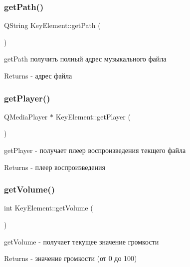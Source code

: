 \subsubsection{\texorpdfstring{get\+Path()}{getPath()}}
{\footnotesize\ttfamily Q\+String Key\+Element\+::get\+Path (\begin{DoxyParamCaption}{ }\end{DoxyParamCaption})}



get\+Path получить полный адрес музыкального файла 

\begin{DoxyReturn}{Returns}
-\/ адрес файла 
\end{DoxyReturn}
\mbox{\label{class_key_element_ae961bfbc0ce3eeb9b62ad12100ca977f}} 
\subsubsection{\texorpdfstring{get\+Player()}{getPlayer()}}
{\footnotesize\ttfamily Q\+Media\+Player $\ast$ Key\+Element\+::get\+Player (\begin{DoxyParamCaption}{ }\end{DoxyParamCaption})}



get\+Player -\/ получает плеер воспроизведения текщего файла 

\begin{DoxyReturn}{Returns}
-\/ плеер воспроизведения 
\end{DoxyReturn}
\mbox{\label{class_key_element_a088397040b8daccb6c7f5cd6cc8ef29f}} 
\subsubsection{\texorpdfstring{get\+Volume()}{getVolume()}}
{\footnotesize\ttfamily int Key\+Element\+::get\+Volume (\begin{DoxyParamCaption}{ }\end{DoxyParamCaption})}



get\+Volume -\/ получает текущее значение громкости 

\begin{DoxyReturn}{Returns}
-\/ значение громкости (от 0 до 100) 
\end{DoxyReturn}
\mbox{\label{class_key_element_a1b70040900c774127a3c1b6530e3374a}} 
